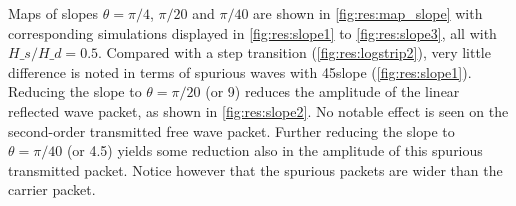 %
%
%
%
%
%
%


Maps of slopes $\theta=\pi/4$, $\pi/20$ and $\pi/40$ are shown in \autoref{fig:res:map_slope} with corresponding simulations displayed in \autoref{fig:res:slope1} to \ref{fig:res:slope3}, all with $H\_s/H\_d = 0.5$.
Compared with a step transition (\autoref{fig:res:logstrip2}), very little difference is noted in terms of spurious waves  with 45\textdegree slope (\autoref{fig:res:slope1}). 
Reducing the slope to $\theta=\pi/20$ (or 9\textdegree) reduces the amplitude of the linear reflected wave packet, as shown in \autoref{fig:res:slope2}. 
No notable effect is seen on the second-order transmitted free wave packet.
Further reducing the slope to $\theta=\pi/40$ (or 4.5\textdegree) yields some reduction also in the amplitude of this spurious transmitted packet.
Notice however that the spurious packets are wider than the carrier packet.



